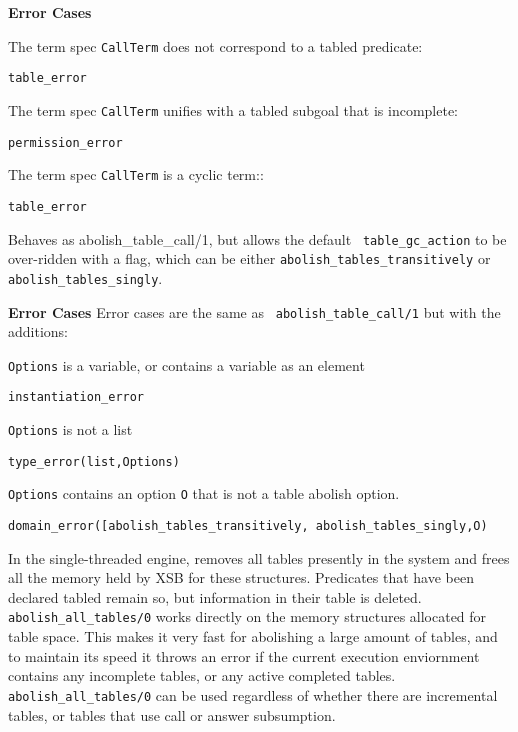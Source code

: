 \begin{description}
\begin{description}
{\bf Error Cases}
\bi
\item The term spec {\tt CallTerm} does not correspond to a tabled predicate:
\bi
\item 	{\tt table\_error}
\ei
\item The term spec {\tt CallTerm} unifies with a tabled subgoal that is incomplete:
\bi
\item 	{\tt permission\_error}
\ei
\item The term spec {\tt CallTerm} is a cyclic term::
\bi
\item 	{\tt table\_error}
\ei
\ei
%

%
Behaves as {abolish\_table\_call/1}, but allows the default {\tt
  table\_gc\_action} to be over-ridden with a flag, which can be either 
{\tt abolish\_tables\_transitively} or {\tt abolish\_tables\_singly}.

{\bf Error Cases} Error cases are the same as {\tt
  abolish\_table\_call/1} but with the additions: 
\bi
\item {\tt Options} is a variable, or contains a variable as an element
\bi
\item {\tt instantiation\_error}
\ei
\item {\tt Options} is not a list
\bi
\item {\tt type\_error(list,Options)}
\ei
\item {\tt Options} contains an option {\tt O} that is not a
  table abolish option.
\bi
\item {\tt domain\_error([abolish\_tables\_transitively, abolish\_tables\_singly,O)}
\ei
\ei




%
In the single-threaded engine, removes all tables presently in the
system and frees all the memory held by XSB for these structures.
Predicates that have been declared tabled remain so, but information
in their table is deleted.  {\tt abolish\_all\_tables/0} works
directly on the memory structures allocated for table space.  This
makes it very fast for abolishing a large amount of tables, and to
maintain its speed it throws an error if the current execution
enviornment contains any incomplete tables, or any active completed
tables.  {\tt abolish\_all\_tables/0} can be used regardless of
whether there are incremental tables, or tables that use call or
answer subsumption.


\end{description}
\end{description}

